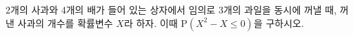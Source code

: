 2개의 사과와 4개의 배가 들어 있는 상자에서 임의로 3개의 과일을 동시에 꺼낼 때, 꺼낸 사과의 개수를 확률변수 $X$라 하자. 이때 $\mathrm{P}(X^2-X\le 0)$을 구하시오.
